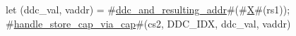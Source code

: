 let (ddc_val, vaddr) = #\hyperref[sailRISCVzddczyandzyresultingzyaddr]{ddc\_and\_resulting\_addr}#(#\hyperref[sailRISCVzX]{X}#(rs1));
#\hyperref[sailRISCVzhandlezystorezycapzyviazycap]{handle\_store\_cap\_via\_cap}#(cs2, DDC_IDX, ddc_val, vaddr)
